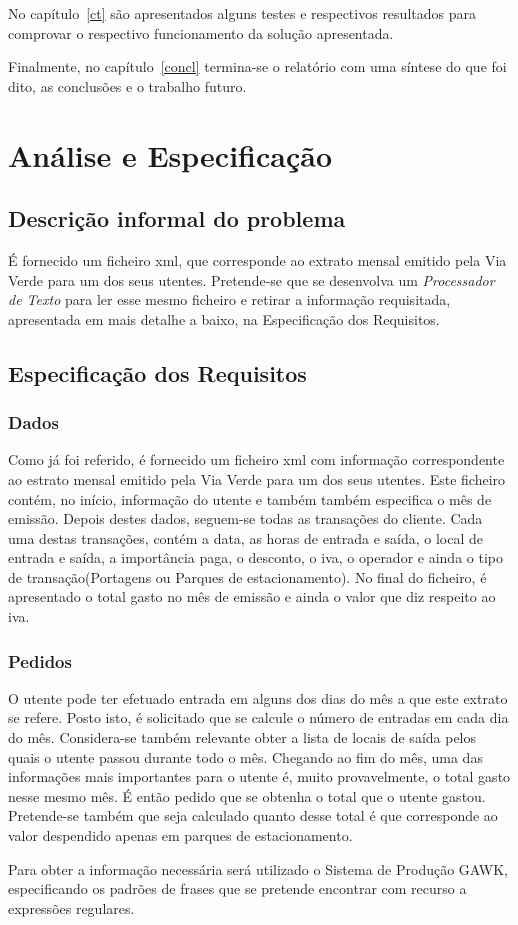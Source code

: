 \documentclass{report}
\def\pt{\emph{Processador de Texto}\xspace}
\begin{document}
No capítulo~\ref{ct} são apresentados alguns testes e respectivos resultados para comprovar o respectivo funcionamento da solução apresentada.

Finalmente, no capítulo~\ref{concl} termina-se o relatório com uma síntese do que foi dito, as conclusões e o trabalho futuro.

\chapter{Análise e Especificação} \label{ae}
\section{Descrição informal do problema}
É fornecido um ficheiro xml, que corresponde ao extrato mensal emitido pela Via Verde para um dos seus utentes. 
Pretende-se que se desenvolva um \pt para ler esse mesmo ficheiro e retirar a informação requisitada, apresentada 
em mais detalhe a baixo, na Especificação dos Requisitos.
\section{Especificação dos Requisitos}
\subsection{Dados}
Como já foi referido, é fornecido um ficheiro xml com informação correspondente ao estrato mensal emitido 
pela Via Verde para um dos seus utentes.
Este ficheiro contém, no início, informação do utente e também também especifica o mês de emissão. 
Depois destes dados, seguem-se todas as transações do cliente.
Cada uma destas transações, contém a data, as horas de entrada e saída, o
local de entrada e saída, a importância paga, o desconto, o iva, o operador
e ainda o tipo de transação(Portagens ou Parques de estacionamento).
No final do ficheiro, é apresentado o total gasto no mês de emissão e ainda
o valor que diz respeito ao iva.
\subsection{Pedidos}
O utente pode ter efetuado entrada em alguns dos dias do mês a que este extrato se refere. 
Posto isto, é solicitado que se calcule o número de entradas em cada dia do mês.
Considera-se também relevante obter a lista de locais de saída pelos quais o utente passou durante todo o mês.
Chegando ao fim do mês, uma das informações mais importantes para o utente é, muito provavelmente, o total gasto nesse mesmo mês. 
É então pedido que se obtenha o total que o utente gastou. Pretende-se também que seja calculado quanto desse total é que corresponde 
ao valor despendido apenas em parques de estacionamento.\par
Para obter a informação necessária será utilizado o Sistema de Produção GAWK, especificando os padrões de frases que se pretende encontrar com recurso a expressões regulares.
\end{document}
